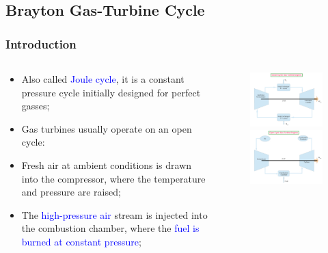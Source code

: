\documentclass[10pt,compress]{beamer}
\begin{document}
\subsection{Brayton Gas-Turbine Cycle}
\begin{frame}
 \frametitle{Introduction}
 \begin{columns}
  \begin{column}[c]{0.6\linewidth} 
   \begin{itemize}
    \item <1-> Also called \textcolor{blue}{Joule cycle}, it is a constant pressure cycle initially designed for perfect gasses;
    \item <2-> Gas turbines usually operate on an open cycle: 
    \item <3-> Fresh air at ambient conditions is drawn into the compressor, where the temperature and pressure are raised;
    \item <4-> The \textcolor{blue}{high-pressure air} stream is injected into the combustion chamber, where the \textcolor{blue}{fuel is burned at constant pressure}; 
   \end{itemize}
  \end{column}
  \begin{column}[c]{0.4\linewidth}
   \begin{figure}%
    \vbox{
     \hbox{\includegraphics[width=5cm,clip]{./Pics/Closed_Gas_Turbine_Engines}}
     \hbox{\includegraphics[width=5cm,clip]{./Pics/Open_Gas_Turbine_Engines}}
     }
   \end{figure}  
  \end{column}  
 \end{columns}
\end{frame}
\end{document}
